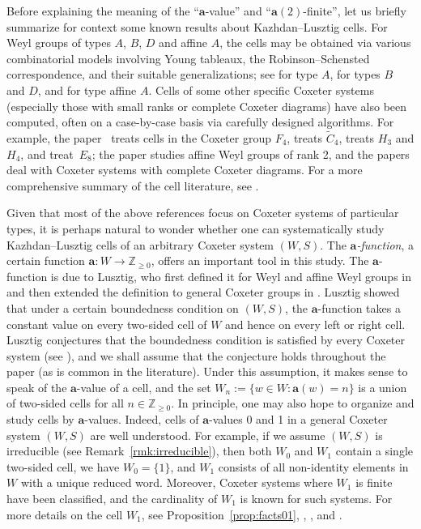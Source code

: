\documentclass[ALCO,Unicode,published]{cedram}
\newcommand{\Z}{\mathbb{Z}}
\newcommand{\la}{\mathbf{a}}
\newcommand{\ra}{\rightarrow}
\begin{document}
Before explaining the meaning of the ``$\la$-value'' and ``$\la(2)$-finite'', let us briefly
summarize for context some known results about Kazhdan--Lusztig cells. For Weyl groups of types $A$,
$B$, $D$ and affine $A$, the cells may be obtained via various combinatorial models involving Young
tableaux, the Robinson--Schensted correspondence, and their suitable generalizations; see
\cite{KL,Ariki} for type $A$, \cite{primitiveIdeals,Garfinkle,TypeBCells} for types $B$ and $D$, and
\cite{ShiCellBook,MatrixBall} for type affine $A$.  Cells of some other specific Coxeter systems
(especially those with small ranks or complete Coxeter diagrams) have also been computed, often  on
a case-by-case basis via carefully designed algorithms.  For example, the paper~\cite{TakahashiF4}
treats cells in the Coxeter group $F_4$, \cite{ShiAffineC4} treats $\tilde C_4$, \cite{AlvisH4}
treats $H_3$ and $H_4$, \cite{ChenE8} and \cite{GeckHallsE8} treat~$E_8$; the paper
\cite{GuilhotRank2} studies affine Weyl groups of rank 2, and the papers \cite{XiComplete, Xie} deal
with Coxeter systems with complete Coxeter diagrams. For a more comprehensive summary of the cell
literature, see \cite[\S 26]{BonnafeCells}. 

Given that most of the above references focus on Coxeter systems of particular types, it is perhaps
natural to wonder whether one can systematically study Kazhdan--Lusztig cells of an arbitrary
Coxeter system $(W,S)$. The \emph{$\la$-function}, a certain function $\la: W\ra \Z_{\ge 0}$, offers
an important tool in this study.  The $\la$-function is due to Lusztig, who first defined it for
Weyl and affine Weyl groups in \cite{LusztigCellI, LusztigCellII} and then extended the definition
to general Coxeter groups in \cite{LusztigHecke}.  Lusztig showed that under a certain boundedness
condition on $(W,S)$, the $\la$-function takes a constant value on every two-sided cell of $W$ and
hence on every left or right cell. Lusztig conjectures that the boundedness condition is satisfied
by every Coxeter system (see \cite[\S13.4]{LusztigHecke}), and we shall assume that the conjecture
holds throughout the paper (as is common in the literature). Under this assumption, it makes sense
to speak of the $\la$-value of a cell, and the set $W_n:=\{w\in W:\la(w)=n\}$ is a union of
two-sided cells for all $n\in \Z_{\ge 0}$.  In principle, one may also hope to organize and study
cells by $\la$-values.  Indeed, cells of $\la$-values 0 and 1 in a general Coxeter system $(W,S)$
are well understood. For example, if we assume $(W,S)$ is {irreducible} (see
Remark~\ref{rmk:irreducible}), then both $W_0$ and $W_1$ contain a single two-sided cell, we have
$W_0=\{1\}$, and $W_1$ consists of all non-identity elements in $W$ with a unique reduced word.
Moreover, Coxeter systems where $W_1$ is finite have been classified, and the cardinality of $W_1$
is known for such systems. For more details on the cell $W_1$, see Proposition~\ref{prop:facts01},
\cite{LusztigSubregular}, \cite{Hart}, \cite[Chapter 13]{BonnafeCells} and \cite{XuSubregular}. 
\end{document}
